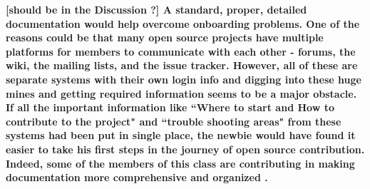 {\bf [should be in the Discussion ?] A standard, proper, detailed documentation  would help overcome onboarding problems. One of the reasons could be  that many open source projects have multiple platforms for members to communicate with each other - forums, the wiki, the mailing lists, and the issue tracker. However, all of these are separate systems with their own login info and digging into these huge mines and getting required information seems to be a major obstacle. If all the important information like ``Where to start and How to contribute to the project" and ``trouble shooting areas" from these systems had been put in single place, the newbie would have found it easier to take his first steps in the journey of open source contribution. Indeed, some of the members of this class are contributing in making documentation more comprehensive and organized .}





